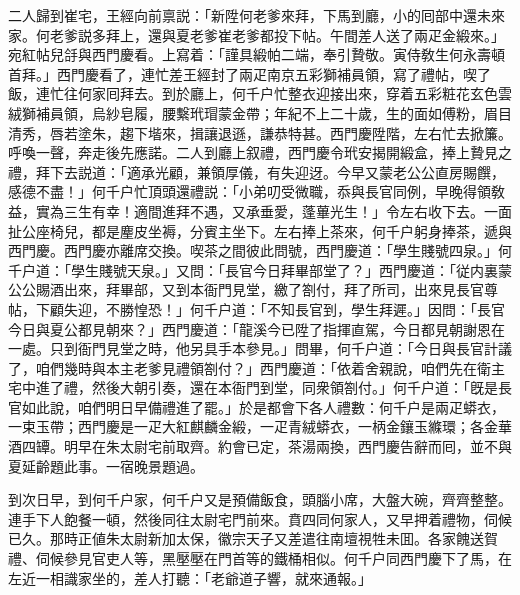 二人歸到崔宅，王經向前禀説：「新陞何老爹來拜，下馬到廳，小的囘部中還未來家。何老爹説多拜上，還與夏老爹崔老爹都投下帖。午間差人送了兩疋金緞來。」宛紅帖兒㧱與西門慶看。上寫着：「謹具緞帕二端，奉引贄敬。寅侍敎生何永壽頓首拜。」西門慶看了，連忙差王經封了兩疋南京五彩獅補員領，寫了禮帖，喫了飯，連忙往何家囘拜去。到於廳上，何千户忙整衣迎接出來，穿着五彩粧花玄色雲絨獅補員領，烏紗皂履，腰繫玳瑁蒙金帶；年紀不上二十歲，生的面如傅粉，眉目清秀，唇若塗朱，趨下堦來，揖讓退遜，謙恭特甚。西門慶陞階，左右忙去掀簾。呼喚一聲，奔走後先應諾。二人到廳上叙禮，西門慶令玳安揭開緞盒，捧上贄見之禮，拜下去説道：「適承光顧，兼領厚儀，有失迎迓。今早又蒙老公公直房賜饌，感德不盡！」何千户忙頂頭還禮説：「小弟叨受微職，忝與長官同例，早晚得領敎益，實為三生有幸！適間進拜不遇，又承垂愛，蓬蓽光生！」令左右收下去。一面扯公座椅兒，都是麈皮坐褥，分賓主坐下。左右捧上茶來，何千户躬身捧茶，遞與西門慶。西門慶亦離席交換。喫茶之間彼此問號，西門慶道：「學生賤號四泉。」何千户道：「學生賤號天泉。」又問：「長官今日拜畢部堂了？」西門慶道：「従内裏蒙公公賜酒出來，拜畢部，又到本衙門見堂，繳了劄付，拜了所司，出來見長官尊帖，下顧失迎，不勝惶恐！」何千户道：「不知長官到，學生拜遲。」因問：「長官今日與夏公都見朝來？」西門慶道：「龍溪今已陞了指揮直駕，今日都見朝謝恩在一處。只到衙門見堂之時，他另具手本參見。」問畢，何千户道：「今日與長官計議了，咱們幾時與本主老爹見禮領劄付？」西門慶道：「依着舍親說，咱們先在衛主宅中進了禮，然後大朝引奏，還在本衙門到堂，同衆領劄付。」何千户道：「旣是長官如此說，咱們明日早備禮進了罷。」於是都會下各人禮數：何千户是兩疋蟒衣，一束玉帶；西門慶是一疋大紅麒麟金緞，一疋青絨蟒衣，一柄金鑲玉縧環；各金華酒四罈。明早在朱太尉宅前取齊。約會已定，茶湯兩換，西門慶告辭而囘，並不與夏延齡題此事。一宿晚景題過。

到次日早，到何千户家，何千户又是預備飯食，頭腦小席，大盤大碗，齊齊整整。連手下人飽餐一頓，然後同往太尉宅門前來。賁四同何家人，又早押着禮物，伺候已久。那時正値朱太尉新加太保，徽宗天子又差遣往南壇視牲未囬。各家餽送賀禮、伺候參見官吏人等，黑壓壓在門首等的鐵桶相似。何千户同西門慶下了馬，在左近一相識家坐的，差人打聽：「老爺道子響，就來通報。」

